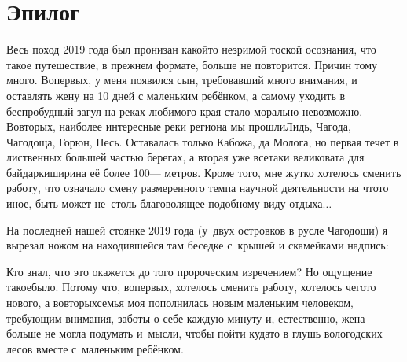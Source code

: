 {
\cleardoublepage
{}

\fancyhead[LE]{\fancyplain{}{}}
\fancyhead[RO]{\fancyplain{}{}}

\section*{Эпилог}
Весь поход 2019 года был пронизан какой\sdash то незримой тоской осознания, что такое путешествие, в прежнем формате, больше не повторится. Причин тому много. Во\sdash первых, у меня появился сын, требовавший много внимания, и оставлять жену на 10 дней с маленьким ребёнком, а самому уходить в беспробудный загул на реках любимого края стало морально невозможно. Во\sdash вторых, наиболее интересные реки региона мы прошли\mdash Лидь, Чагода, Чагодоща, Горюн, Песь. Оставалась только Кабожа, да Молога, но первая течет в лиственных большей частью берегах, а вторая уже все\sdash таки великовата для байдарки\mdash ширина её более 100\thinspace\nobreakdash--- метров. Кроме того, мне жутко хотелось сменить работу, что означало смену размеренного темпа научной деятельности на что\sdash то иное, быть может не~столь благоволящее подобному виду отдыха$\ldots$ 

На последней нашей стоянке 2019 года (у~двух островков в русле Чагодощи) я вырезал ножом на находившейся там беседке с~крышей и скамейками надпись:

{\centering\Large{}}

Кто знал, что это окажется до того пророческим изречением? Но ощущение такое\mdash было. Потому что, во\sdash первых, хотелось сменить работу, хотелось чего\sdash то нового, а во\sdash вторых\mdash семья моя пополнилась новым маленьким человеком, требующим внимания, заботы о себе каждую минуту и, естественно, жена больше не могла подумать и~мысли, чтобы пойти куда\sdash то в глушь вологодских лесов вместе с~маленьким ребёнком.

}
